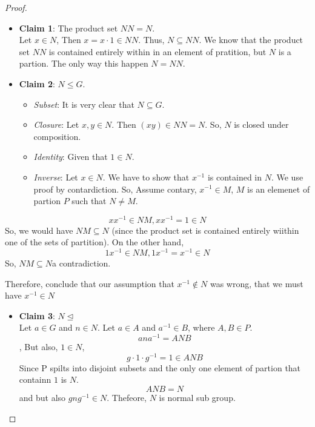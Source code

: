 \documentclass[
]{book}
\providecommand{\tightlist}{%
  \setlength{\itemsep}{0pt}\setlength{\parskip}{0pt}}
\theoremstyle{definition}
\theoremstyle{definition}
\theoremstyle{definition}
\theoremstyle{definition}
\theoremstyle{remark}
\begin{document}
\begin{proof}
\leavevmode

\begin{itemize}
\item
  \textbf{Claim 1}: The product set \(NN=N\).\\
  Let \(x\in N\), Then \(x=x\cdot 1 \in NN\). Thus, \(N \subseteq NN\). We know that the product set \(NN\) is contained entirely within in an element of pratition, but \(N\) is a partion. The only way this happen \(N=NN\).
\item
  \textbf{Claim 2}: \(N \leq G\).\\

  \begin{itemize}
  \tightlist
  \item
    \emph{Subset}: It is very clear that \(N \subseteq G\).
  \item
    \emph{Closure}: Let \(x,y\in N\). Then \((xy)\in NN=N\). So, \(N\) is closed under composition.
  \item
    \emph{Identity}: Given that \(1\in N\).
  \item
    \emph{Inverse}: Let \(x\in N\). We have to show that \(x^{-1}\) is contained in \(N\). We use proof by contardiction. So, Assume contary, \(x^{-1}\in M\), \(M\) is an elemenet of partion \(P\) such that \(N\neq M\).
  \end{itemize}
\end{itemize}

\[xx^{-1}\in NM, xx^{-1}=1 \in  N\]
So, we would have \(NM \subseteq N\) (since the product set is contained entirely wiithin one of the sets of partition). On the other hand,
\[1x^{-1}\in NM, 1x^{-1}=x^{-1} \in N\]
So, \(NM\subseteq N\)a contradiction.

Therefore, conclude that our assumption that \(x^{-1}\not\in N\) was wrong, that we must have \(x^{-1}\in N\)

\begin{itemize}
\tightlist
\item
  \textbf{Claim 3}: \(N\trianglelefteq\)\\
  Let \(a\in G\) and \(n\in N\). Let \(a\in A\) and \(a^{-1}\in B\), where \(A,B\in P\).
  \[ana^{-1}=ANB\],
  But also, \(1\in N\),
  \[g\cdot 1 \cdot g ^{-1}=1\in ANB\]
  Since P spilts into disjoint subsets and the only one element of partion that containn \(1\) is \(N\).
  \[ANB=N\]
  and but also \(gng^{-1}\in N\). Thefeore, \(N\) is normal sub group.
\end{itemize}


\end{proof}
\end{document}
